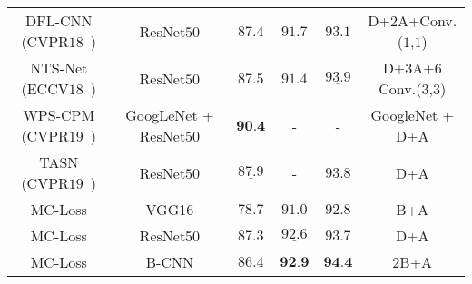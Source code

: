\documentclass[journal]{IEEEtran}
\begin{document}
\begin{table*}[!t]
\begin{tabular}{|c|c|c|c|c|c|}
    DFL-CNN (CVPR$18$~\cite{wang2018learning})   & ResNet$50$                 & $87.4$                        & $91.7$                        & $93.1$            & D+$2$A+Conv.($1$,$1$) \\
    NTS-Net (ECCV$18$~\cite{yang2018learning})   & ResNet$50$                 & $87.5$                        & $91.4$                        & $\underline{\textit{93.9}}$   & D+$3$A+$6$Conv.($3$,$3$) \\
    WPS-CPM (CVPR$19$~\cite{Ge_2019_CVPR})       & GoogLeNet + ResNet$50$     & $\textbf{90.4}$               &      -                        & -                  & GoogleNet + D+A \\
    TASN (CVPR$19$~\cite{Zheng_2019_CVPR})       & ResNet$50$                 & $\underline{\textit{87.9}}$   &      -                        & $93.8$                  &  D+A \\
    \hline
    \hline
    MC-Loss                                      & VGG16                      & $78.7$                        & $91.0$                        & $92.8$ & B+A \\
    MC-Loss                                      & ResNet50                   & $87.3$                        & $\underline{\textit{92.6}}$   & $93.7$ & D+A \\   
    MC-Loss                                      & B-CNN                      & $86.4$                        & $\textbf{92.9}$               & $\textbf{94.4}$ & $2$B+A \\
    \hline
    \end{tabular}\label{tab:SOTA}\end{table*}
\end{document}
